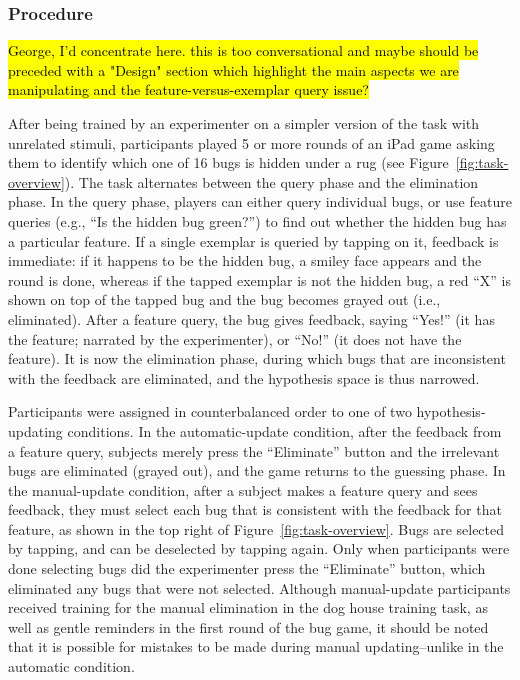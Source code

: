 \documentclass[10pt,letterpaper]{article}
\begin{document}
\subsubsection{Procedure}

\hl{George, I'd concentrate here.  this is too conversational and maybe
should be preceded with a "Design" section which highlight the main
aspects we are manipulating and the feature-versus-exemplar query issue?}

After being trained by an experimenter on a simpler version of the task with 
unrelated stimuli, participants played 5 or more 
rounds of an iPad game asking them to identify which one of 16 bugs is hidden 
under a rug (see Figure~\ref{fig:task-overview}). The task alternates between the 
query phase and the elimination phase. In the query phase, players can either query 
individual bugs, or use feature queries (e.g., ``Is the hidden bug green?'') to find out 
whether the hidden bug has a particular feature. If a single exemplar is queried by 
tapping on it, feedback is immediate: if it happens to be the hidden bug, a smiley 
face appears and the round is done, whereas if the tapped exemplar is not the 
hidden bug, a red ``X'' is shown on top of the tapped bug and the bug becomes 
grayed out (i.e., eliminated). After a feature query, the bug gives feedback, saying 
``Yes!'' (it has the feature; narrated by the experimenter), or ``No!'' (it does not have 
the feature). It is now the elimination phase, during which bugs that are inconsistent 
with the feedback are eliminated, and the hypothesis space is thus narrowed. 

Participants were assigned in counterbalanced order to one of two hypothesis-
updating conditions. In the automatic-update condition, after the feedback from a 
feature query, subjects merely press the ``Eliminate'' button and the irrelevant bugs 
are eliminated (grayed out), and the game returns to the guessing phase. In the 
manual-update condition, after a subject makes a feature query and sees feedback, 
they must select each bug that is consistent with the feedback for that feature, as 
shown in the top right of Figure~\ref{fig:task-overview}. Bugs are selected by 
tapping, and can be deselected by tapping again. Only when participants were done 
selecting bugs did the experimenter press the ``Eliminate'' button, which eliminated 
any bugs that were not selected. Although manual-update participants received 
training for the manual elimination in the dog house training task, as well as gentle 
reminders in the first round of the bug game, it should be noted that it is possible for 
mistakes to be made during manual updating--unlike in the automatic condition.
\end{document}
